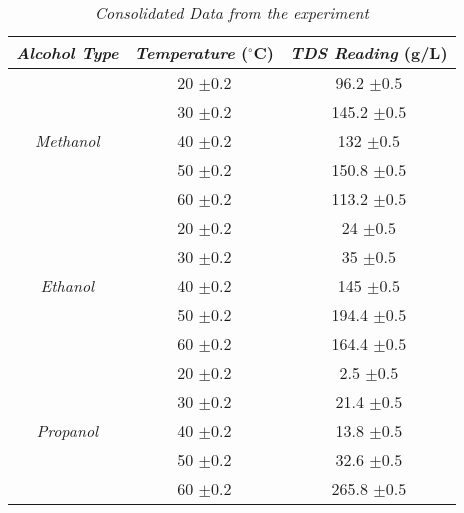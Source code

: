 





\begin{table}[H]
  \centering
  \caption{\textit{Consolidated Data from \of the experiment}}
    \begin{tabular}{ccc}
    \toprule
    \textit{Alcohol Type} & \textit{Temperature} ($^\circ$C) & \textit{TDS Reading} (g/L) \\
    \midrule
    \multirow{5}[10]{*}{\textit{Methanol}} & 20 $\pm 0.2$    & 96.2 $\pm 0.5$ \\
\cmidrule{2-3}          & 30 $\pm 0.2$    & 145.2 $\pm 0.5$ \\
\cmidrule{2-3}          & 40 $\pm 0.2$    & 132 $\pm 0.5$ \\
\cmidrule{2-3}          & 50 $\pm 0.2$    & 150.8 $\pm 0.5$ \\
\cmidrule{2-3}          & 60 $\pm 0.2$    & 113.2 $\pm 0.5$ \\
    \midrule
    \multirow{5}[10]{*}{\textit{Ethanol}} & 20 $\pm 0.2$    & 24 $\pm 0.5$ \\
\cmidrule{2-3}          & 30 $\pm 0.2$    & 35 $\pm 0.5$ \\
\cmidrule{2-3}          & 40 $\pm 0.2$    & 145 $\pm 0.5$ \\
\cmidrule{2-3}          & 50 $\pm 0.2$    & 194.4 $\pm 0.5$ \\
\cmidrule{2-3}          & 60 $\pm 0.2$    & 164.4 $\pm 0.5$ \\
    \midrule
    \multirow{5}[10]{*}{\textit{Propanol}} & 20 $\pm 0.2$    & 2.5 $\pm 0.5$ \\
\cmidrule{2-3}          & 30 $\pm 0.2$    & 21.4 $\pm 0.5$ \\
\cmidrule{2-3}          & 40 $\pm 0.2$    & 13.8 $\pm 0.5$ \\
\cmidrule{2-3}          & 50 $\pm 0.2$    & 32.6 $\pm 0.5$ \\
\cmidrule{2-3}          & 60 $\pm 0.2$    & 265.8 $\pm 0.5$ \\

\end{tabular}
\end{table}
